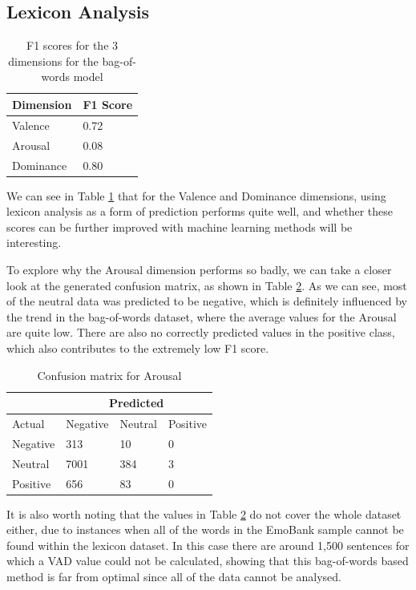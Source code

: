 \subsection{Lexicon Analysis}

\begin{table}
\centering
\caption{F1 scores for the 3 dimensions for the bag-of-words model}
\begin{tabular}{ |p{3cm}|p{3cm}|}
 \hline
  Dimension & F1 Score \\
 \hline
  Valence & 0.72\\
  Arousal & 0.08 \\
  Dominance & 0.80\\
 \hline
\end{tabular}
\label{lexicon:f1}
\end{table}

We can see in Table \ref{lexicon:f1} that for the Valence and Dominance dimensions, using lexicon analysis as a form of prediction performs quite well, and whether these scores can be further improved with machine learning methods will be interesting.

To explore why the Arousal dimension performs so badly, we can take a closer look at the generated confusion matrix, as shown in Table \ref{lexicon:a:conmat}. As we can see, most of the neutral data was predicted to be negative, which is definitely influenced by the trend in the bag-of-words dataset, where the average values for the Arousal are quite low. There are also no correctly predicted values in the positive class, which also contributes to the extremely low F1 score.

\begin{table}
\centering
\caption{Confusion matrix for Arousal}
\begin{tabular}{ |p{3cm}|p{3cm}|p{3cm}|p{3cm}| }
 \hline
  & \multicolumn{3}{|c|}{Predicted} \\
 \hline
   Actual & Negative & Neutral & Positive \\
    \hline
    Negative &  313   &  10  & 0 \\
    Neutral & 7001 & 384 &  3 \\
    Positive & 656 & 83 &  0 \\
 \hline
\end{tabular}
\label{lexicon:a:conmat}
\end{table}


It is also worth noting that the values in Table \ref{lexicon:a:conmat} do not cover the whole dataset either, due to instances when all of the words in the EmoBank sample cannot be found within the lexicon dataset. In this case there are around 1,500 sentences for which a VAD value could not be calculated, showing that this bag-of-words based method is far from optimal since all of the data cannot be analysed.

